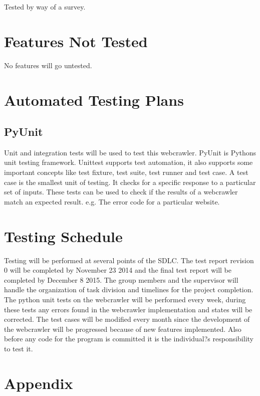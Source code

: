 \documentclass[12pt, titlepage]{article}
\begin{document}
Tested by way of a survey.


\section{Features Not Tested}
No features will go untested.


\section{Automated Testing Plans}
\subsection{PyUnit}
Unit and integration tests will be used to test this webcrawler. PyUnit is Python\textsc{}s unit testing framework. Unittest supports test automation, it also supports some important concepts like test fixture, test suite, test runner and test case. A test case is the smallest unit of testing. It checks for a specific response to a particular set of inputs.  These tests can be used to check if the results of a webcrawler match an expected result. e.g. The error code for a particular website.

\section{Testing Schedule}
Testing will be performed at several points of the SDLC.  The test report revision 0 will be completed by November 23 2014 and the final test report will be completed by December 8 2015. The group members and the supervisor will handle the organization of task division and timelines for the project completion. The python unit tests on the webcrawler will be performed every week, during these tests any errors found in the webcrawler implementation and states will be corrected. The test cases will be modified every month since the development of the webcrawler will be progressed because of new features implemented. Also before any code for the program is committed it is the individual?s responsibility to test it.

\pagebreak
\section{Appendix}
\end{document}
